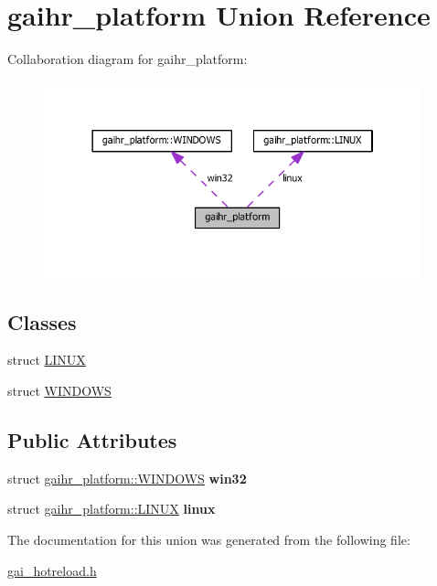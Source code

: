 \hypertarget{uniongaihr__platform}{}\section{gaihr\+\_\+platform Union Reference}
\label{uniongaihr__platform}


Collaboration diagram for gaihr\+\_\+platform\+:
\nopagebreak
\begin{figure}[H]
\begin{center}
\leavevmode
\includegraphics[width=310pt]{uniongaihr__platform__coll__graph}
\end{center}
\end{figure}
\subsection*{Classes}
\begin{DoxyCompactItemize}
\item 
struct \hyperlink{structgaihr__platform_1_1_l_i_n_u_x}{L\+I\+N\+UX}
\item 
struct \hyperlink{structgaihr__platform_1_1_w_i_n_d_o_w_s}{W\+I\+N\+D\+O\+WS}
\end{DoxyCompactItemize}
\subsection*{Public Attributes}
\begin{DoxyCompactItemize}
\item 
\mbox{\label{uniongaihr__platform_a3e8f59781b8c5c0d322c5c7b40ccce25}} 
struct \hyperlink{structgaihr__platform_1_1_w_i_n_d_o_w_s}{gaihr\+\_\+platform\+::\+W\+I\+N\+D\+O\+WS} {\bfseries win32}
\item 
\mbox{\label{uniongaihr__platform_a681729ef2f92556fc4d402c31301abcc}} 
struct \hyperlink{structgaihr__platform_1_1_l_i_n_u_x}{gaihr\+\_\+platform\+::\+L\+I\+N\+UX} {\bfseries linux}
\end{DoxyCompactItemize}


The documentation for this union was generated from the following file\+:\begin{DoxyCompactItemize}
\item 
\hyperlink{gai__hotreload_8h}{gai\+\_\+hotreload.\+h}\end{DoxyCompactItemize}

